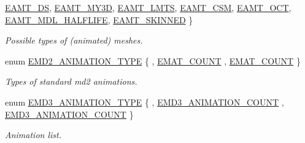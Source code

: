 \begin{DoxyCompactItemize}
\hyperlink{namespaceirr_1_1scene_a2fc85a64604521ca063f1881b5dd1c61a34ae02d88e51b4c013c8d6a1a739e011}{E\+A\+M\+T\+\_\+DS}, 
\hyperlink{namespaceirr_1_1scene_a2fc85a64604521ca063f1881b5dd1c61a7506637385b5e215fbe63088de655f0f}{E\+A\+M\+T\+\_\+\+M\+Y3D}, 
\hyperlink{namespaceirr_1_1scene_a2fc85a64604521ca063f1881b5dd1c61a61c39e45ad6d3dded612220d81b1221e}{E\+A\+M\+T\+\_\+\+L\+M\+TS}, 
\newline
\hyperlink{namespaceirr_1_1scene_a2fc85a64604521ca063f1881b5dd1c61a0e2d98f60f7d1b930498d80c4dc4bce4}{E\+A\+M\+T\+\_\+\+C\+SM}, 
\hyperlink{namespaceirr_1_1scene_a2fc85a64604521ca063f1881b5dd1c61aa5ed61d08d512b0d08e372c3ba341cd4}{E\+A\+M\+T\+\_\+\+O\+CT}, 
\hyperlink{namespaceirr_1_1scene_a2fc85a64604521ca063f1881b5dd1c61a9c67a4cfcd21165e23e32f502aceb8b2}{E\+A\+M\+T\+\_\+\+M\+D\+L\+\_\+\+H\+A\+L\+F\+L\+I\+FE}, 
\hyperlink{namespaceirr_1_1scene_a2fc85a64604521ca063f1881b5dd1c61a9a9566728770f539eacc9291b20a243a}{E\+A\+M\+T\+\_\+\+S\+K\+I\+N\+N\+ED}
 \}\begin{DoxyCompactList}\small\item\em Possible types of (animated) meshes. \end{DoxyCompactList}
\item 
enum \hyperlink{namespaceirr_1_1scene_a08d4a84966e1d2886d0d57e4acbb4f19}{E\+M\+D2\+\_\+\+A\+N\+I\+M\+A\+T\+I\+O\+N\+\_\+\+T\+Y\+PE} \{ , \hyperlink{namespaceirr_1_1scene_a08d4a84966e1d2886d0d57e4acbb4f19abf12473333d2c8af36fe17e12167bba4}{E\+M\+A\+T\+\_\+\+C\+O\+U\+NT}
, \hyperlink{namespaceirr_1_1scene_a08d4a84966e1d2886d0d57e4acbb4f19abf12473333d2c8af36fe17e12167bba4}{E\+M\+A\+T\+\_\+\+C\+O\+U\+NT}
 \}\begin{DoxyCompactList}\small\item\em Types of standard md2 animations. \end{DoxyCompactList}
\item 
enum \hyperlink{namespaceirr_1_1scene_ac15a7915ea13336cdc38f1073888fcd3}{E\+M\+D3\+\_\+\+A\+N\+I\+M\+A\+T\+I\+O\+N\+\_\+\+T\+Y\+PE} \{ , \hyperlink{namespaceirr_1_1scene_ac15a7915ea13336cdc38f1073888fcd3a3973c8d21d2dc25b7aa0997644996f2d}{E\+M\+D3\+\_\+\+A\+N\+I\+M\+A\+T\+I\+O\+N\+\_\+\+C\+O\+U\+NT}
, \hyperlink{namespaceirr_1_1scene_ac15a7915ea13336cdc38f1073888fcd3a3973c8d21d2dc25b7aa0997644996f2d}{E\+M\+D3\+\_\+\+A\+N\+I\+M\+A\+T\+I\+O\+N\+\_\+\+C\+O\+U\+NT}
 \}\begin{DoxyCompactList}\small\item\em Animation list. \end{DoxyCompactList}
\item 

\end{DoxyCompactItemize}
